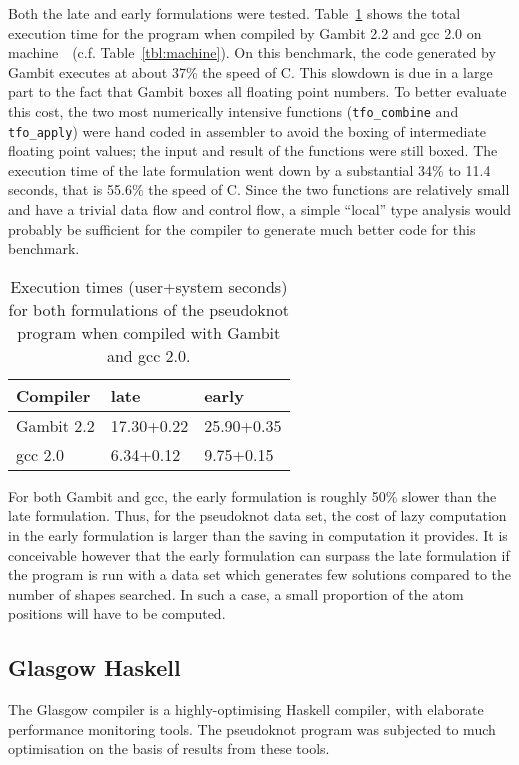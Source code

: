 Both the late and early formulations were tested.
Table~\ref{tbl:gambit} shows the total execution time for the program
when compiled by Gambit 2.2 and gcc 2.0 on
machine~\sysgambit~(c.f. Table~\ref{tbl:machine}).  On this benchmark,
the code generated by Gambit executes at about 37\% the speed of C.
This slowdown is due in a large part to the fact that Gambit boxes all
floating point numbers.  To better evaluate this cost, the two most
numerically intensive functions (\verb=tfo_combine= and
\verb=tfo_apply=) were hand coded in assembler to avoid the boxing of
intermediate floating point values; the input and result of the
functions were still boxed.  The execution time of the late formulation
went down by a substantial 34\% to 11.4 seconds, that is 55.6\% the
speed of C.  Since the two functions are relatively small and have a
trivial data flow and control flow, a simple ``local'' type analysis
would probably be sufficient for the compiler to generate much better
code for this benchmark.

\begin{table}
\begin{center}
\begin{tabular}{|l|l|l|}
\hline
Compiler   & late       & early       \\
\hline
Gambit 2.2 & 17.30+0.22 & 25.90+0.35  \\
gcc 2.0    &  6.34+0.12 &  9.75+0.15  \\
\hline
\end{tabular}
\end{center}
\caption{Execution times (user+system seconds) for both formulations
of the pseudoknot program when compiled with Gambit and gcc 2.0.}
\label{tbl:gambit}
\end{table}

For both Gambit and gcc, the early formulation is roughly 50\% slower than
the late formulation.  Thus, for the pseudoknot data set, the cost of
lazy computation in the early formulation is larger than the saving
in computation it provides.  It is conceivable however that the early
formulation can surpass the late formulation if the program is run with a
data set which generates few solutions compared to the number of
shapes searched.  In such a case, a small proportion of the atom
positions will have to be computed.

\subsection{Glasgow Haskell}
\label{sec:ghc}
The Glasgow compiler is a highly-optimising Haskell compiler, with
elaborate performance monitoring tools.  The pseudoknot program was
subjected to much optimisation on the basis of results from these
tools.

